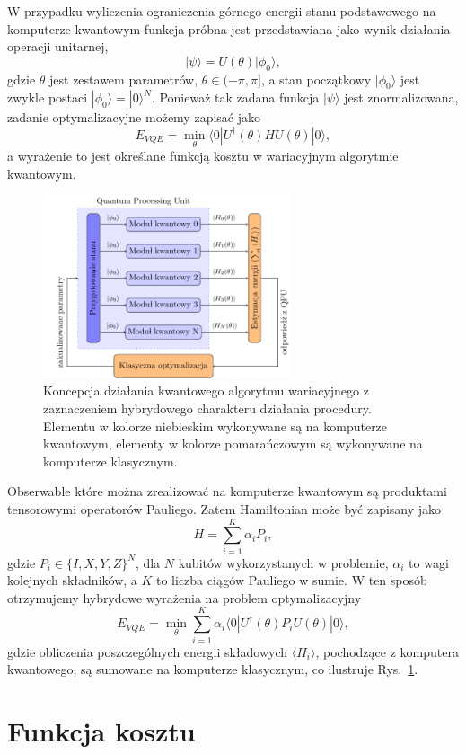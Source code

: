 \documentclass[a4paper,11pt]{article}
\newcommand{\ket}[1]{| #1 \rangle}
\newcommand{\bra}[1]{\langle #1 |}
\begin{document}
W przypadku wyliczenia ograniczenia górnego energii stanu podstawowego na komputerze kwantowym funkcja próbna jest przedstawiana jako wynik działania operacji unitarnej, 
\begin{equation}
	\ket{\psi} = U(\theta) \ket{\phi_0},
\end{equation}
gdzie $\theta$ jest zestawem parametrów, $\theta\in(-\pi,\pi]$, a stan początkowy $\ket{\phi_0}$ jest zwykle postaci $\ket{\phi_0}=\ket{0}^N$. Ponieważ tak zadana funkcja $\ket{\psi}$ jest znormalizowana, zadanie optymalizacyjne możemy zapisać jako
\begin{equation}
E_{VQE} = \min_\theta \bra{0} U^\dagger(\theta) H U(\theta)\ket{0},
\label{eqn:vqe-min}
\end{equation}
a wyrażenie to jest określane funkcją kosztu w wariacyjnym algorytmie kwantowym.

\begin{figure}[ht!]
	\centering
	\includegraphics[width=0.65\textwidth]{vqe-pl.pdf}
	\caption{Koncepcja działania kwantowego algorytmu wariacyjnego z zaznaczeniem hybrydowego charakteru działania procedury. Elementu w kolorze niebieskim wykonywane są na komputerze kwantowym, elementy w kolorze pomarańczowym są wykonywane na komputerze klasycznym.}
	\label{fig:koncepcja-vqe}
\end{figure}

Obserwable które można zrealizować na komputerze kwantowym są produktami tensorowymi operatorów Pauliego. Zatem Hamiltonian może być zapisany jako
\begin{equation}
	H = \sum_{i=1}^K \alpha_i P_i,
\end{equation}
gdzie $P_i\in \{I,X,Y,Z\}^N$, dla $N$ kubitów wykorzystanych w problemie, $\alpha_i$ to wagi kolejnych składników, a $K$ to liczba ciągów Pauliego w sumie.  W ten sposób otrzymujemy hybrydowe wyrażenia na problem optymalizacyjny
\begin{equation}
	E_{VQE} =  \min_\theta \sum_{i=1}^K \alpha_i  \bra{0} U^\dagger(\theta) P_i U(\theta)\ket{0},
\end{equation}	
gdzie obliczenia poszczególnych energii składowych $\langle H_i \rangle$, pochodzące z komputera kwantowego, są sumowane na komputerze klasycznym, co ilustruje Rys.~\ref{fig:koncepcja-vqe}.
\hypertarget{funkcja-kosztu}{%
	\section{Funkcja kosztu}\label{funkcja-kosztu}}
\end{document}
